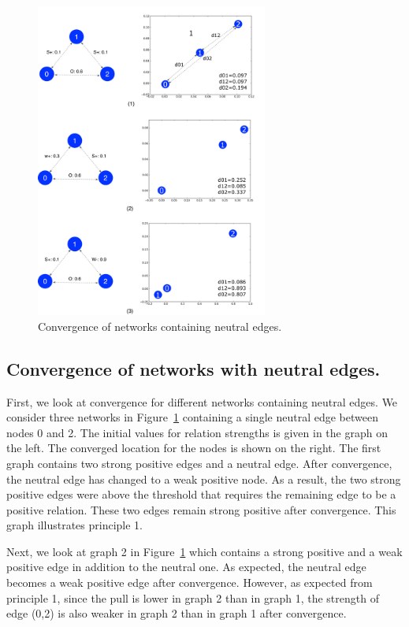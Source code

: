 \documentclass[acmtweb]{acmsmall}
\begin{document}
\begin{figure}[th]
\centering
\includegraphics[width=3in]{stylized1.pdf}
\caption{\label{fig:style1} Convergence of networks containing neutral edges.}
\end{figure}

\subsection{Convergence of networks with neutral edges.}
First, we look at convergence for different networks containing
neutral edges. We consider three networks in Figure~\ref{fig:style1}
containing a single neutral edge between nodes 0 and 2. The initial
values for relation strengths is given in the graph on the left. The
converged location for the nodes is shown on the right. The first
graph contains two strong positive edges and a neutral edge. After
convergence, the neutral edge has changed to a weak positive node.  As
a result, the two strong positive edges were above the threshold that
requires the remaining edge to be a positive relation. These two edges
remain strong positive after convergence. This graph illustrates
principle 1.

Next, we look at graph 2 in Figure~\ref{fig:style1} which contains a
strong positive and a weak positive edge in addition to the neutral
one. As expected, the neutral edge becomes a weak positive edge after
convergence. However, as expected from principle 1, since the pull is
lower in graph 2 than in graph 1, the strength of edge (0,2) is also
weaker in graph 2 than in graph 1 after convergence.
\end{document}
